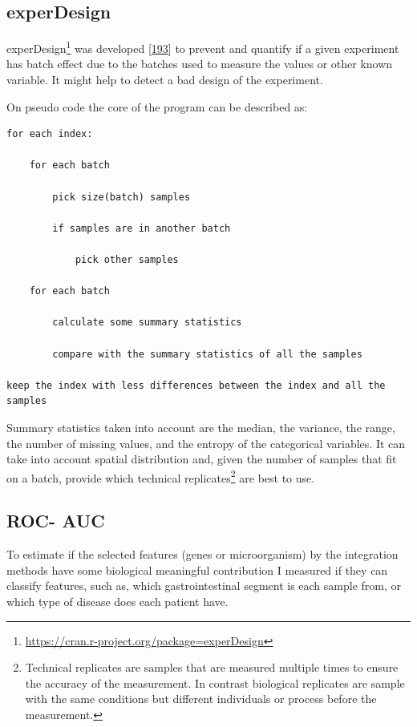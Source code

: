 \documentclass[
  a4paper,
]{book}
\DeclareRobustCommand{\href}[2]{#2\footnote{\url{#1}}}
\begin{document}
\hypertarget{experdesign}{%
\subsection{experDesign}\label{experdesign}}

\href{https://cran.r-project.org/package=experDesign}{experDesign} was developed {[}\protect\hyperlink{ref-revillasancho2021}{193}{]} to prevent and quantify if a given experiment has batch effect due to the batches used to measure the values or other known variable.
It might help to detect a bad design of the experiment.

On pseudo code the core of the program can be described as:

\hypertarget{pseudocode-experDesign}{%
\label{pseudocode-experDesign}}%
\begin{verbatim}
for each index:

    for each batch

        pick size(batch) samples

        if samples are in another batch

            pick other samples

    for each batch

        calculate some summary statistics

        compare with the summary statistics of all the samples

keep the index with less differences between the index and all the samples
\end{verbatim}

Summary statistics taken into account are the median, the variance, the range, the number of missing values, and the entropy of the categorical variables.
It can take into account spatial distribution and, given the number of samples that fit on a batch, provide which technical replicates\footnote{Technical replicates are samples that are measured multiple times to ensure the accuracy of the measurement.
  In contrast biological replicates are sample with the same conditions but different individuals or process before the measurement.} are best to use.

\hypertarget{ROC}{%
\subsection{ROC- AUC}\label{ROC}}

To estimate if the selected features (genes or microorganism) by the integration methods have some biological meaningful contribution I measured if they can classify features, such as, which gastrointestinal segment is each sample from, or which type of disease does each patient have.
\end{document}

